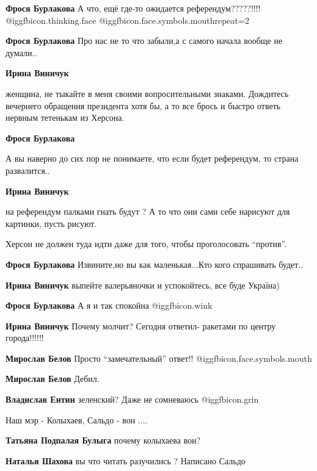 \begin{itemize}
\begin{itemize}
\textbf{Фрося Бурлакова} А что, ещё где-то ожидается референдум?????!!!!  @igg{fbicon.thinking.face}  @igg{fbicon.face.symbols.mouth}{repeat=2} 

\textbf{Фрося Бурлакова} Про нас не то что забыли,а с самого начала вообще не думали..

\textbf{Ирина Виничук} 

женщина, не тыкайте в меня своими вопросительными знаками. Дождитесь вечернего
обращения президента хотя бы, а то все брось и быстро ответь нервным тетенькам
из Херсона.

\textbf{Фрося Бурлакова} 

А вы наверно до сих пор не понимаете, что если будет референдум, то страна
развалится..

\textbf{Ирина Виничук} 

на референдум палками гнать будут ? А то что они сами себе нарисуют для
картинки, пусть рисуют.

Херсон не должен туда идти даже для того, чтобы проголосовать \enquote{против}.

\textbf{Фрося Бурлакова} Извините,но вы как маленькая...Кто кого спрашивать будет..

\textbf{Ирина Виничук} выпейте валерьяночки и успокойтесь, все буде Україна)

\textbf{Фрося Бурлакова} А я и так спокойна @igg{fbicon.wink} 

\textbf{Ирина Виничук} Почему молчит? Сегодня ответил- ракетами по центру города!!!!!!

\textbf{Мирослав Белов} Просто \enquote{замечательный} ответ!!  @igg{fbicon.face.symbols.mouth} 

\textbf{Мирослав Белов} Дебил.

\textbf{Владислав Ентин} зеленский? Даже не сомневаюсь  @igg{fbicon.grin} 

\end{itemize} %

Наш мэр - Колыхаев, Сальдо - вон ....

\begin{itemize} %
\textbf{Татьяна Подпалая Булыга} почему колыхаева вон?

\textbf{Наталья Шахова} вы что читать разучились ? Написано Сальдо


\end{itemize}
\end{itemize}
